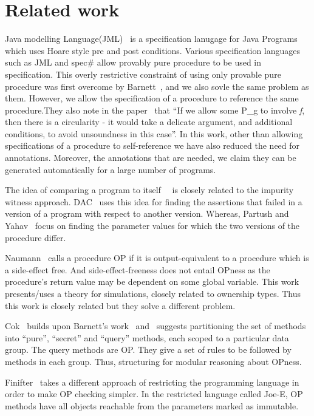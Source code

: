 \section{Related work}\label{sec:related}
Java modelling Language(JML)~\cite{leavens2008jml} is a specification
lanugage for Java Programs which uses Hoare style pre and post
conditions. Various specification languages such as JML and spec\#
allow provably pure procedure to be used in specification.
This overly restrictive constraint of using only provable pure
procedure was first overcome by Barnett~\cite{barnett200499}, and we
also sovle the same problem as them. However, we allow the
specification of a procedure to reference the same procedure.They also
note in the paper~\cite{barnett200499} that ``If we allow some P_g to
involve \textit{f}, then there is a circularity - it would take a
delicate argument, and additional conditions, to avoid unsoundness in
this case''. In this work, other than allowing specifications of a
procedure to self-reference we have also reduced the need for
annotations. Moreover, the annotations that are needed, we claim they
can be generated automatically for a large number of programs.

The idea of comparing a program to
itself~\cite{lahiri2013differential}~\cite{partush2013abstract} is
closely related to the impurity witness
approach. DAC~\cite{lahiri2013differential} uses this idea for finding
the assertions that failed in a version of a program with respect to
another version. Whereas, Partush and Yahav~\cite{partush2013abstract}
focus on finding the parameter values for which the two versions of
the procedure differ.

Naumann~\cite{naumann2007observational} calls a procedure OP if it is
output-equivalent to a procedure which is a side-effect free. And
side-effect-freeness does not entail OPness as the procedure's return
value may be dependent on some global variable. This work
presents/uses a theory for simulations, closely related to ownership
types. Thus this work is closely related but they solve a different
problem.

Cok~\cite{cok2008extensions} builds upon Barnett's
work~\cite{barnett2006allowing} and~\cite{barnett200499} suggests
partitioning the set of methods into ``pure'', ``secret'' and
``query'' methods, each scoped to a particular data group. The query
methods are OP. They give a set of rules to be followed by methods in
each group. Thus, structuring for modular reasoning about OPness.

Finifter~\cite{cok2008extensions} takes a different approach of
restricting the programming language in order to make OP checking
simpler. In the restricted language called Joe-E, OP methods have all
objects reachable from the parameters marked as immutable.

